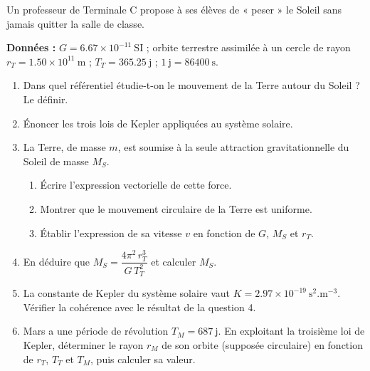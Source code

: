 \documentclass[11pt]{article}
\begin{document}
\begin{exercice}
Un professeur de Terminale C propose à ses élèves de « peser » le Soleil sans jamais quitter la salle de classe.

\textbf{Données :} $G = \num{6,67}\times 10^{-11}\ \mathrm{SI}$ ; orbite terrestre assimilée à un cercle de rayon $r_T = \num{1,50}\times 10^{11}\ \mathrm{m}$ ; $T_T = \num{365,25}\ \mathrm{j}$ ; $1\ \mathrm{j} = \num{86400}\ \mathrm{s}$.
\begin{enumerate}
\item Dans quel référentiel étudie-t-on le mouvement de la Terre autour du Soleil ? Le définir.
\item Énoncer les trois lois de Kepler appliquées au système solaire.
\item La Terre, de masse $m$, est soumise à la seule attraction gravitationnelle du Soleil de masse $M_S$.
\begin{enumerate}
\item Écrire l'expression vectorielle de cette force.
\item Montrer que le mouvement circulaire de la Terre est uniforme.
\item Établir l'expression de sa vitesse $v$ en fonction de $G$, $M_S$ et $r_T$.
\end{enumerate}
\item En déduire que $M_S = \dfrac{4\pi^2\,r_T^3}{G\,T_T^2}$ et calculer $M_S$.
\item La constante de Kepler du système solaire vaut $K = \num{2,97}\times 10^{-19}\ \mathrm{s^2.m^{-3}}$. Vérifier la cohérence avec le résultat de la question 4.
\item Mars a une période de révolution $T_M = \num{687}\ \mathrm{j}$. En exploitant la troisième loi de Kepler, déterminer le rayon $r_M$ de son orbite (supposée circulaire) en fonction de $r_T$, $T_T$ et $T_M$, puis calculer sa valeur.
\end{enumerate}
\end{exercice}
\end{document}
